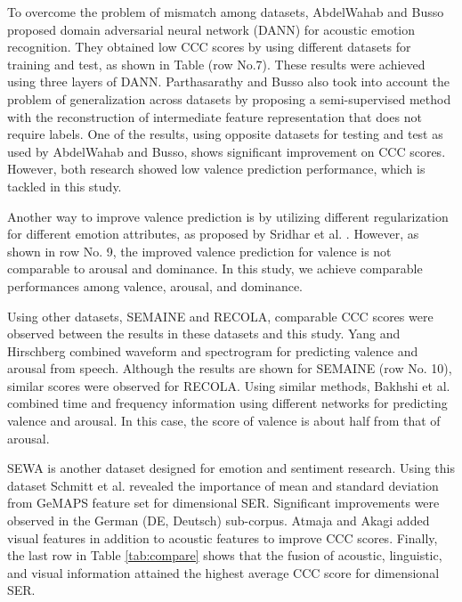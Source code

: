 To overcome the problem of mismatch among datasets, AbdelWahab and Busso
\cite{Abdelwahab2018} proposed domain adversarial neural network (DANN) for
acoustic emotion recognition. They obtained low CCC scores by using different
datasets for training and test, as shown in Table (row No.7). These results
were achieved using three layers of DANN. Parthasarathy
and Busso \cite{Parthasarathy2019} also took into account the problem of
generalization across datasets by proposing a semi-supervised method with
the reconstruction of intermediate feature representation that does not require
labels. One of the results, using opposite datasets for testing and test as used
by AbdelWahab and Busso, shows significant improvement on CCC scores. However,
both research \cite{Abdelwahab2018,Parthasarathy2019} showed low valence
prediction performance, which is tackled in this study.

Another way to improve valence prediction is by utilizing different
regularization for different emotion attributes, as proposed by Sridhar et al.
\cite{Sridhar2018}. However, as shown in row No. 9, the improved valence
prediction for valence is not comparable to arousal and dominance. In this
study, we achieve comparable performances among valence, arousal, and
dominance.  

Using other datasets, SEMAINE and RECOLA, comparable CCC scores were observed
between the results in these datasets and this study. Yang and Hirschberg
\cite{Yang2018} combined waveform and spectrogram for predicting valence and
arousal from speech. Although the results are shown for SEMAINE (row No. 10),
similar scores were observed for RECOLA. Using similar methods, Bakhshi
et al. \cite{Bakhshi2020} combined time and frequency information using
different networks for predicting valence and arousal. In this case, the score
of valence is about half from that of arousal.

SEWA is another dataset designed for emotion and sentiment research. Using this
dataset Schmitt et al. \cite{Schmitt2018} revealed the importance of mean and
standard deviation from GeMAPS feature set for dimensional SER. Significant
improvements were observed in the German (DE, Deutsch) sub-corpus. Atmaja and
Akagi \cite{Atmaja2020} added visual features in addition to acoustic features
to improve CCC scores. Finally, the last row in Table \ref{tab:compare} shows
that the fusion of acoustic, linguistic, and visual information attained the
highest average CCC score for dimensional SER.

